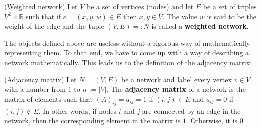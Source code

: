 \begin{definition}{(Weighted network)}
    Let $V$ be a set of vertices (nodes) and let $E$ be a set of triples $V^2 \times \mathbb{R}$ such that if $e = (x, y, w) \in E$ then $x, y \in V$. The value $w$ is said to be the weight of the edge and the tuple $(V, E) =: N$ is called a \textbf{weighted network}\label{def:weighted_network}.
\end{definition}

The objects defined above are useless without a rigorous way of mathematically representing them. To that end, we have to come up with a way of describing a network mathematically. This leads us to the definition of the adjacency matrix:

\begin{definition}{(Adjacency matrix)}
    Let $N = (V, E)$ be a network and label every vertex $v \in V$ with a number from $1$ to $n := |V|$. The \textbf{adjacency matrix} of a network is the matrix of elements such that $(A)_{ij} = a_{ij} = 1$ if $(i, j) \in E$ and $a_{ij} = 0$ if $(i, j) \notin E$. In other words, if nodes $i$ and $j$ are connected by an edge in the network, then the corresponding element in the matrix is $1$. Otherwise, it is $0$\label{def:adjacency_matrix}.
\end{definition}


